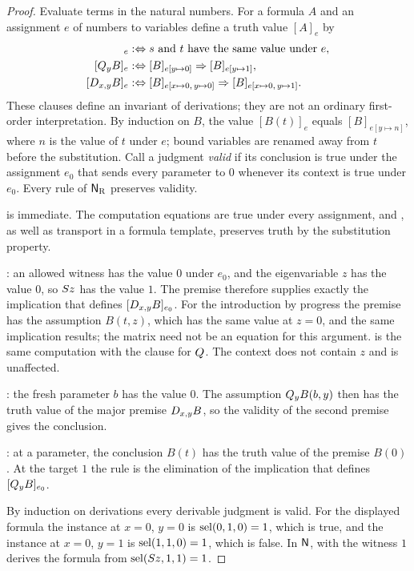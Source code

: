 \begin{proof}
Evaluate terms in the natural numbers.  For a formula $A$ and an assignment
$e$ of numbers to variables define a truth value $[A]_e$ by
\begin{align*}
 [s=t]_e &\iffdef \text{$s$ and $t$ have the same value under $e$},\\
 [\Q{y}B]_e &\iffdef [B]_{e[y\mapsto 0]}\Rightarrow[B]_{e[y\mapsto 1]},\\
 [\D{x}{y}B]_e &\iffdef
   [B]_{e[x\mapsto 0,\,y\mapsto 0]}\Rightarrow[B]_{e[x\mapsto 0,\,y\mapsto 1]} .
\end{align*}
These clauses define an invariant of derivations; they are not an ordinary
first-order interpretation.  By induction on $B$, the value
$[B(t)]_e$ equals $[B]_{e[y\mapsto n]}$, where $n$ is the value of $t$ under
$e$; bound variables are renamed away from $t$ before the substitution.
Call a judgment \emph{valid} if its conclusion is true under the assignment
$e_0$ that sends every parameter to $0$ whenever its context is true under
$e_0$.  Every rule of $\mathsf{N}_{\mathrm R}$ preserves validity.

 is immediate.  The computation equations are true under every
assignment, and , as well as transport in a formula template,
preserves truth by the substitution property.

: an allowed witness has the value $0$ under $e_0$, and the
eigenvariable $z$ has the value $0$, so $S z$ has the value $1$.  The
premise therefore supplies exactly the implication that defines
$[D_{x,y}B]_{e_0}$.  For the introduction by progress the premise has the
assumption $B(t,z)$, which has the same value at $z=0$, and the same
implication results; the matrix need not be an equation for this argument.
 is the same computation with the clause for $Q_{}$.  The
context does not contain $z$ and is unaffected.

: the fresh parameter $b$ has the value $0$.  The assumption
$Q_{y}B(b,y)$ then has the truth value of the major premise
$D_{x,y}B$, so the validity of the second premise gives the conclusion.

: at a parameter, the conclusion $B(t)$ has the truth value of
the premise $B(0)$.  At the target $1$ the rule is the elimination of the
implication that defines $[Q_{y}B]_{e_0}$.

By induction on derivations every derivable judgment is valid.  For the
displayed formula the instance at $x=0$, $y=0$ is $\operatorname{sel}(0,1,0)=1$, which is
true, and the instance at $x=0$, $y=1$ is $\operatorname{sel}(1,1,0)=1$, which is false.
In $\mathsf{N}$,  with the witness $1$ derives the formula from
$\operatorname{sel}(S z,1,1)=1$.
\end{proof}


